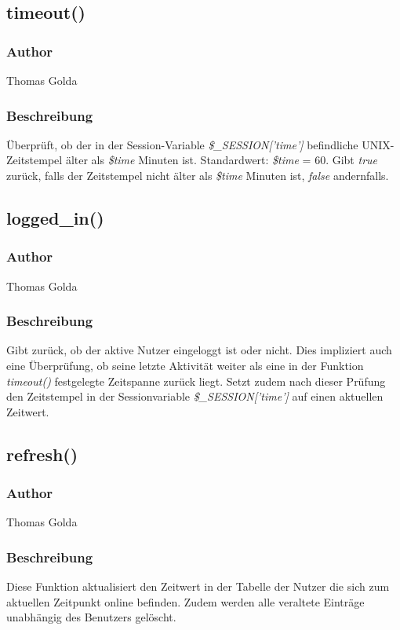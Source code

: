 \documentclass[fontsize = 12pt, paper = a4]{scrreprt}
\begin{document}
\subsection*{timeout()}
\subsubsection*{Author}
Thomas Golda
\subsubsection*{Beschreibung}
Überprüft, ob der in der Session-Variable \textit{\$\_SESSION['time']} befindliche UNIX-Zeitstempel älter als \textit{\$time} Minuten ist. Standardwert: \textit{\$time} = 60.
Gibt \textit{true} zurück, falls der Zeitstempel nicht älter als \textit{\$time} Minuten ist, \textit{false} andernfalls.


\subsection*{logged\_in()}
\subsubsection*{Author}
Thomas Golda
\subsubsection*{Beschreibung}
Gibt zurück, ob der aktive Nutzer eingeloggt ist oder nicht. Dies impliziert auch eine Überprüfung, ob seine letzte Aktivität weiter als eine in der Funktion \textit{timeout()} festgelegte Zeitspanne zurück liegt.
Setzt zudem nach dieser Prüfung den Zeitstempel in der Sessionvariable \textit{\$\_SESSION['time']} auf einen aktuellen Zeitwert.

\subsection*{refresh()}
\subsubsection*{Author}
Thomas Golda
\subsubsection*{Beschreibung}
Diese Funktion aktualisiert den Zeitwert in der Tabelle der Nutzer die sich zum aktuellen Zeitpunkt online befinden. Zudem werden alle veraltete Einträge unabhängig des Benutzers gelöscht.
\end{document}
